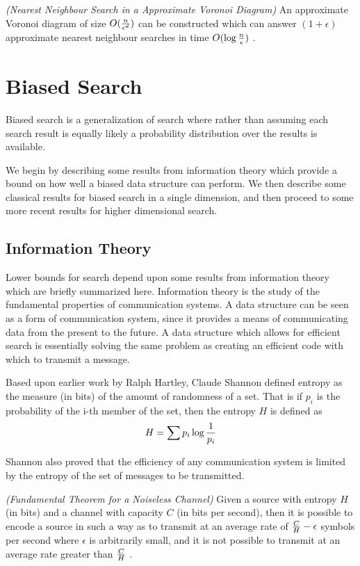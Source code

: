 \documentclass[mcs]{scsthesis}
\begin{document}
\begin{thm} \emph{(Nearest Neighbour Search in a Approximate Voronoi Diagram)} 
An approximate Voronoi diagram of size \(O({n \over \epsilon ^ d})\) can be
constructed which can answer \((1 + \epsilon)\) approximate nearest neighbour
searches in time \(O(\log {n \over \epsilon})\) \cite{arya-avd}.
\end{thm}

\section{Biased Search}

Biased search is a generalization of search where rather than assuming each
search result is equally likely a probability distribution over the results is
available.

We begin by describing some results from information theory which provide a
bound on how well a biased data structure can perform. We then describe some
classical results for biased search in a single dimension, and then proceed
to some more recent results for higher dimensional search.

\subsection{Information Theory}

Lower bounds for search depend upon some results from information theory which
are briefly summarized here. Information theory is the study of the fundamental
properties of communication systems. A data structure can be seen as a form of
communication system, since it provides a means of communicating data from the
present to the future.  A data structure which allows for efficient search is
essentially solving the same problem as creating an efficient code with which
to transmit a message.

Based upon earlier work by Ralph Hartley, Claude Shannon \cite{claudeshannonwasagod}
defined entropy as the measure (in bits) of the amount of randomness of a set.
That is if \(p_i\) is the probability of the i-th member of the set, then the
entropy \(H\) is defined as
$$
H = \sum{ p_i \log{1 \over p_i}}
$$

Shannon also proved that the efficiency of any communication system is limited
by the entropy of the set of messages to be transmitted.

\begin{thm} \emph{(Fundamental Theorem for a Noiseless Channel)} 
Given a source with entropy \(H\) (in bits) and a channel with capacity \(C\)
(in bits per second), then it is possible to encode a source in such a way as to
transmit at an average rate of \({C \over H} - \epsilon\) symbols per second
where \(\epsilon\) is arbitrarily small, and it is not possible to transmit
at an average rate greater than \(C \over H\) \cite{claudeshannonwasagod}.
\end{thm}
\end{document}
